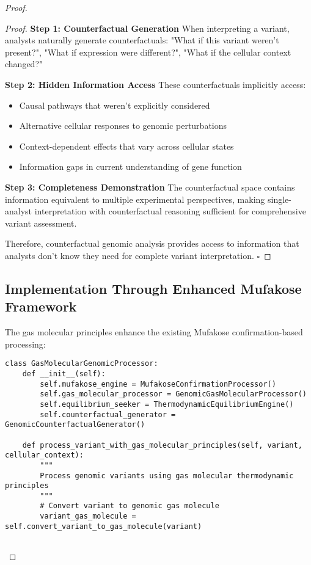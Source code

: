\documentclass[12pt,a4paper]{article}
\begin{document}
\begin{proof}
\begin{proof}
\textbf{Step 1: Counterfactual Generation}
When interpreting a variant, analysts naturally generate counterfactuals: "What if this variant weren't present?", "What if expression were different?", "What if the cellular context changed?"

\textbf{Step 2: Hidden Information Access}
These counterfactuals implicitly access:
\begin{itemize}
\item Causal pathways that weren't explicitly considered
\item Alternative cellular responses to genomic perturbations
\item Context-dependent effects that vary across cellular states
\item Information gaps in current understanding of gene function
\end{itemize}

\textbf{Step 3: Completeness Demonstration}
The counterfactual space contains information equivalent to multiple experimental perspectives, making single-analyst interpretation with counterfactual reasoning sufficient for comprehensive variant assessment.

Therefore, counterfactual genomic analysis provides access to information that analysts don't know they need for complete variant interpretation. $\square$
\end{proof}

\subsection{Implementation Through Enhanced Mufakose Framework}

The gas molecular principles enhance the existing Mufakose confirmation-based processing:

\begin{lstlisting}[style=pythonstyle, caption=Gas Molecular Enhanced Genomic Processing]
class GasMolecularGenomicProcessor:
    def __init__(self):
        self.mufakose_engine = MufakoseConfirmationProcessor()
        self.gas_molecular_processor = GenomicGasMolecularProcessor()
        self.equilibrium_seeker = ThermodynamicEquilibriumEngine()
        self.counterfactual_generator = GenomicCounterfactualGenerator()
        
    def process_variant_with_gas_molecular_principles(self, variant, cellular_context):
        """
        Process genomic variants using gas molecular thermodynamic principles
        """
        # Convert variant to genomic gas molecule
        variant_gas_molecule = self.convert_variant_to_gas_molecule(variant)
        

\end{lstlisting}
\end{proof}
\end{document}
